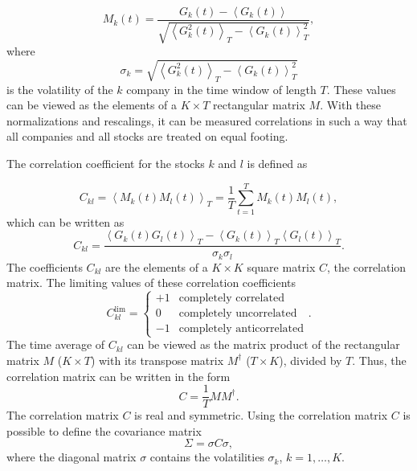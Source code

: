 \begin{equation}
    M_{k} \left( t \right) = \frac{G_{k} \left( t \right) - \left\langle
    G_{k} \left( t \right) \right\rangle} {\sqrt{\left\langle G_{k}^{2}
    \left( t \right) \right\rangle_{T} - \left\langle G_{k} \left( t \right)
    \right\rangle^2_{T}}},
\end{equation}
where
\begin{equation}
    \sigma_{k} = \sqrt{\left\langle G_{k}^{2}
    \left( t \right) \right\rangle_{T} - \left\langle G_{k} \left( t \right)
    \right\rangle^2_{T}}
\end{equation}
is the volatility of the $k$ company in the time window of length $T$. These
values can be viewed as the elements of a $K \times T$ rectangular matrix $M$.
With these normalizations and rescalings, it can be measured correlations in
such a way that all companies and all stocks are treated on equal footing.

The correlation coefficient for the stocks $k$ and $l$ is defined as
\cite{non_stationarity_fin_guhr}

\begin{equation}
    C_{kl} = \left\langle M_{k} \left( t \right) M_{l} \left( t \right)
    \right\rangle_{T} = \frac{1}{T} \sum_{t=1}^{T} M_{k} \left( t \right) M_{l}
    \left( t \right),
\end{equation}
which can be written as
\begin{equation}
    C_{kl} = \frac{\left\langle G_{k} \left( t \right) G_{l} \left( t \right)
    \right\rangle_{T} - \left\langle G_{k} \left( t \right) \right\rangle_{T}
    \left\langle G_{l} \left( t \right) \right\rangle_{T}}
    {\sigma_{k} \sigma_{l}}.
\end{equation}
The coefficients $C_{kl}$ are the elements of a $K \times K$ square matrix $C$,
the correlation matrix. The limiting values of these correlation coefficients
\begin{equation}
    C_{kl}^{\text{lim}} =
    \left\{
    \begin{array}{cc}
    +1 & \text{completely correlated}  \\
    0  & \text{completely uncorrelated}\\
    -1 & \text{completely anticorrelated}
    \end{array}
    \right. .
\end{equation}
The time average of $C_{kl}$ can be viewed as the matrix product of the
rectangular matrix $M$ ($K \times T$) with its transpose matrix $M^{\dagger}$
($T \times K$), divided by $T$. Thus, the correlation matrix can be written in
the form
\begin{equation}
    C = \frac{1}{T} M M^{\dagger}.
\end{equation}
The correlation matrix $C$ is real and symmetric. Using the correlation matrix
$C$ is possible to define the covariance matrix
\cite{credit_risk_guhr,portfolio_distributions_guhr,asset_correlations_guhr,stochastic_cov_guhr,exact_distributions_guhr}
\begin{equation}
    \Sigma = \sigma C \sigma ,
\end{equation}
where the diagonal matrix $\sigma$ contains the volatilities $\sigma_{k}$,
$k = 1, \ldots, K$.

